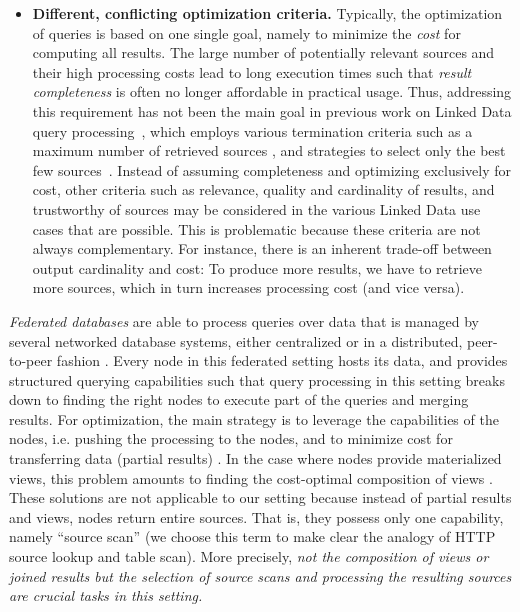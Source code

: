 \begin{itemize}
\item \textbf{Different, conflicting optimization criteria.}
  Typically, the optimization of queries is based on one single goal,
  namely to minimize the \emph{cost} for computing all results. The
  large number of potentially relevant sources and their high
  processing costs lead to long execution times such that \emph{result
    completeness} is often no longer affordable in practical
  usage. Thus, addressing this requirement has not been the main goal in
  previous work on Linked Data query
  processing~\cite{hartig_executing_2009,harth_data_2010,ladwig_linked_2010}, which
  employs various termination criteria such as a maximum number of
  retrieved sources \cite{harth_data_2010}, and strategies to select only the best few sources~\cite{ladwig_linked_2010}. 
  Instead of assuming completeness and optimizing exclusively for cost, other 
  criteria such as relevance, quality and cardinality of results, and trustworthy of sources may be considered in the various Linked Data use cases that are
  possible. This is problematic because these criteria are not always
  complementary. For instance, there is an inherent trade-off between
  output cardinality and cost: To produce more results, we have to
  retrieve more sources, which in turn increases processing cost (and
  vice versa).
\end{itemize}

\emph{Federated databases} are able to process queries over data that
is managed by several networked database systems, either centralized
\cite{zsu_principles_2011} or in a distributed, peer-to-peer fashion
\cite{huebsch_architecture_2005}. Every node in this federated setting 
hosts its data, and provides structured querying
capabilities such that query processing in this setting breaks down to
finding the right nodes to execute part of the queries and merging
results. For optimization, the main strategy is to leverage the
capabilities of the nodes, i.e. pushing the processing to the nodes,
and to minimize cost for transferring data (partial results)
\cite{kossmann_iterative_2000,zsu_principles_2011}. In the case where
nodes provide materialized views, this problem amounts to finding the
cost-optimal composition of views
\cite{pottinger_minicon:_2001}. These solutions are not applicable to
our setting because instead of partial results and views, nodes return
entire sources. That is, they possess only one capability, namely
``source scan'' (we choose this term to make clear the analogy of HTTP
source lookup and table scan). More precisely, \emph{not the
  composition of views or joined results but the selection of source scans and processing the resulting sources are crucial tasks in this setting.}


